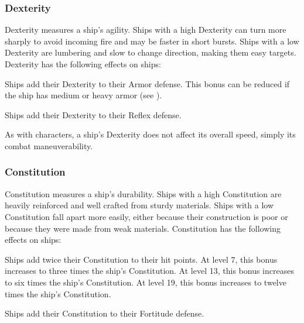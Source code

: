         \subsubsection{Dexterity}
            Dexterity measures a ship's agility.
            Ships with a high Dexterity can turn more sharply to avoid incoming fire and may be faster in short bursts.
            Ships with a low Dexterity are lumbering and slow to change direction, making them easy targets.
            Dexterity has the following effects on ships:
            \begin{raggeditemize}
                \item Ships add their Dexterity to their Armor defense.
                    This bonus can be reduced if the ship has medium or heavy armor (see ).
                \item Ships add their Dexterity to their Reflex defense.
            \end{raggeditemize}

            As with characters, a ship's Dexterity does not affect its overall speed, simply its combat maneuverability.

        \subsubsection{Constitution}
            Constitution measures a ship's durability.
            Ships with a high Constitution are heavily reinforced and well crafted from sturdy materials.
            Ships with a low Constitution fall apart more easily, either because their construction is poor or because they were made from weak materials.
            Constitution has the following effects on ships:
            \begin{raggeditemize}
                \item Ships add twice their Constitution to their hit points.
                    At level 7, this bonus increases to three times the ship's Constitution.
                    At level 13, this bonus increases to six times the ship's Constitution.
                    At level 19, this bonus increases to twelve times the ship's Constitution.
                \item Ships add their Constitution to their Fortitude defense.
            \end{raggeditemize}

